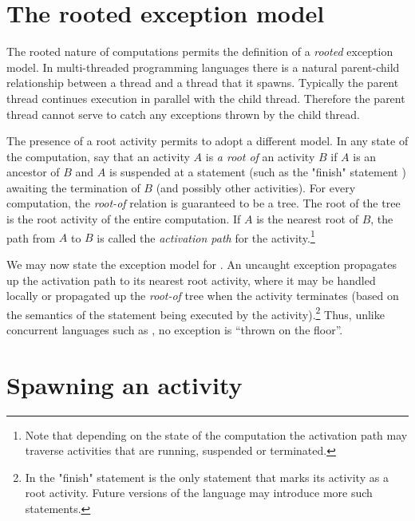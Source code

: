 
\section{The \Xten{} rooted exception model}
\label{ExceptionModel}

The rooted nature of \Xten{} computations permits the definition of a
{\em rooted} exception model. In multi-threaded programming languages
there is a natural parent-child relationship between a thread and a
thread that it spawns. Typically the parent thread continues execution
in parallel with the child thread. Therefore the parent thread cannot
serve to catch any exceptions thrown by the child thread. 

The presence of a root activity permits \Xten{} to adopt a different
model.  In any state of the computation, say that an activity $A$ is
{\em a root of} an activity $B$ if $A$ is an ancestor of $B$ and $A$
is suspended at a statement (such as the \xcd"finish" statement
) awaiting the termination of $B$ (and possibly other
activities). For every \Xten{} computation, the
\emph{root-of} relation
is guaranteed to be a tree. The root of the tree is the root activity
of the entire computation. If $A$ is the nearest root of $B$, the path
from $A$ to $B$ is called the {\em activation path} for the
activity.\footnote{Note that depending on the state of the computation
the activation path may traverse activities that are running,
suspended or terminated.}

We may now state the exception model for \Xten.  An uncaught exception
propagates up the activation path to its nearest root activity, where
it may be handled locally or propagated up the \emph{root-of} tree when
the activity terminates (based on the semantics of the statement being
executed by the activity).\footnote{In \XtenCurrVer{} the \xcd"finish"
statement is the only statement that marks its activity as a root
activity. Future versions of the language may introduce more such
statements.}  Thus, unlike concurrent languages such as \java{}, no
exception is ``thrown on the floor''.

\section{Spawning an activity}\label{AsynchronousActivity}\label{AsyncActivity}

